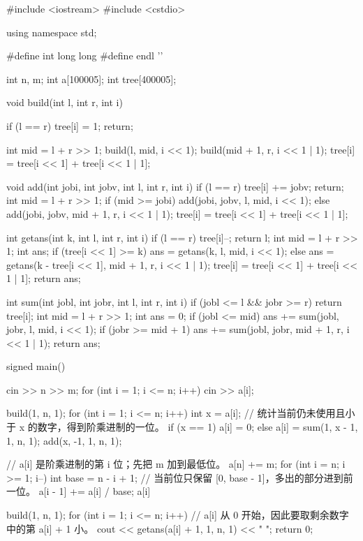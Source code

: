 \documentclass[UTF8,a4paper,11pt]{ctexart}
\begin{document}
\begin{CodeBlock}
#include <iostream>
#include <cstdio>

using namespace std;

#define int long long
#define endl '\n'

int n, m;
int a[100005];
int tree[400005];

void build(int l, int r, int i) {
    if (l == r) {
        tree[i] = 1;
        return;
    }

    int mid = l + r >> 1;
    build(l, mid, i << 1);
    build(mid + 1, r, i << 1 | 1);
    tree[i] = tree[i << 1] + tree[i << 1 | 1];
}

void add(int jobi, int jobv, int l, int r, int i) {
    if (l == r) {
        tree[i] += jobv;
        return;
    }
    int mid = l + r >> 1;
    if (mid >= jobi)
        add(jobi, jobv, l, mid, i << 1);
    else
        add(jobi, jobv, mid + 1, r, i << 1 | 1);
    tree[i] = tree[i << 1] + tree[i << 1 | 1];
}

int getans(int k, int l, int r, int i) {
    if (l == r) {
        tree[i]--;
        return l;
    }
    int mid = l + r >> 1;
    int ans;
    if (tree[i << 1] >= k)
        ans = getans(k, l, mid, i << 1);
    else
        ans = getans(k - tree[i << 1], mid + 1, r, i << 1 | 1);
    tree[i] = tree[i << 1] + tree[i << 1 | 1];
    return ans;
}

int sum(int jobl, int jobr, int l, int r, int i) {
    if (jobl <= l && jobr >= r)
        return tree[i];
    int mid = l + r >> 1;
    int ans = 0;
    if (jobl <= mid)
        ans += sum(jobl, jobr, l, mid, i << 1);
    if (jobr >= mid + 1)
        ans += sum(jobl, jobr, mid + 1, r, i << 1 | 1);
    return ans;
}

signed main() {
    cin >> n >> m;
    for (int i = 1; i <= n; i++)
        cin >> a[i];

    build(1, n, 1);
    for (int i = 1; i <= n; i++) {
        int x = a[i];
        // 统计当前仍未使用且小于 x 的数字，得到阶乘进制的一位。
        if (x == 1)
            a[i] = 0;
        else
            a[i] = sum(1, x - 1, 1, n, 1);
        add(x, -1, 1, n, 1);
    }

    // a[i] 是阶乘进制的第 i 位；先把 m 加到最低位。
    a[n] += m;
    for (int i = n; i >= 1; i--) {
        int base = n - i + 1;
        // 当前位只保留 [0, base - 1]，多出的部分进到前一位。
        a[i - 1] += a[i] / base;
        a[i] %
    }

    build(1, n, 1);
    for (int i = 1; i <= n; i++)
        // a[i] 从 0 开始，因此要取剩余数字中的第 a[i] + 1 小。
        cout << getans(a[i] + 1, 1, n, 1) << " ";
    return 0;
}
\end{CodeBlock}
\end{document}
